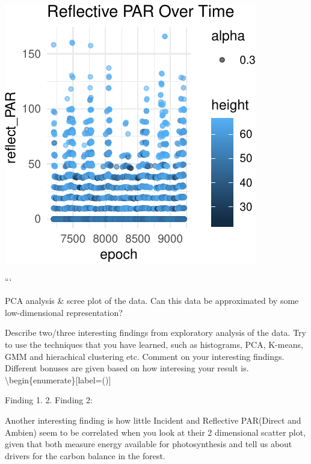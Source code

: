 \documentclass[]{article}
\begin{document}
\begin{center}\includegraphics{Project1WriteUp_files/figure-latex/unnamed-chunk-17-2} \end{center}

```

PCA analysis \& scree plot of the data. Can this data be approximated by
some low-dimensional representation?

Describe two/three interesting findings from exploratory analysis of the
data. Try to use the techniques that you have learned, such as
histograms, PCA, K-means, GMM and hierachical clustering etc. Comment on
your interesting findings. Different bonuses are given based on how
interesing your result is.
\textbackslash{}begin\{enumerate\}{[}label=(\alph*){]} \item Finding 1.
2. Finding 2:

Another interesting finding is how little Incident and Reflective
PAR(Direct and Ambien) seem to be correlated when you look at their 2
dimensional scatter plot, given that both measure energy available for
photosynthesis and tell us about drivers for the carbon balance in the
forest.
\end{document}
